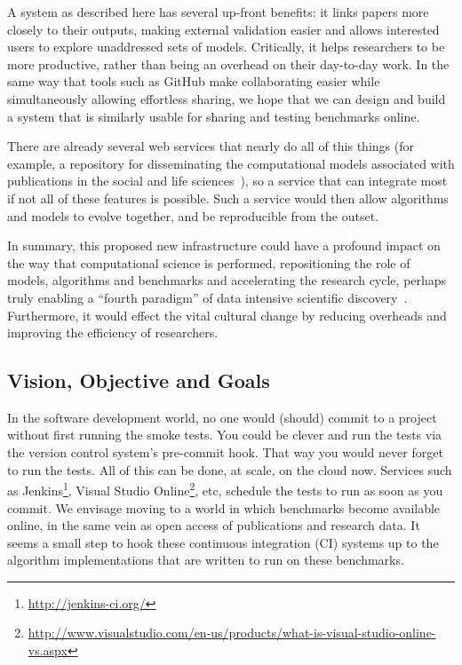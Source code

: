\documentclass[a4paper,11pt]{article}
\begin{document}
A system as described here has several up-front benefits: it links
papers more closely to their outputs, making external validation
easier and allows interested users to explore unaddressed sets of
models. Critically, it helps researchers to be more productive, rather
than being an overhead on their day-to-day work. In the same way that
tools such as GitHub make collaborating easier while simultaneously
allowing effortless sharing, we hope that we can design and build a
system that is similarly usable for sharing and testing benchmarks
online.

There are already several web services that nearly do all of this
things (for example, a repository for disseminating the computational
models associated with publications in the social and life
sciences~\cite{rollins-et-al:2014}), so a service that can integrate
most if not all of these features is possible. Such a service would
then allow algorithms and models to evolve together, and be
reproducible from the outset.

In summary, this proposed new infrastructure could have a profound
impact on the way that computational science is performed,
repositioning the role of models, algorithms and benchmarks and
accelerating the research cycle, perhaps truly enabling a ``fourth
paradigm'' of data intensive scientific
discovery~\cite{hey:2009}. Furthermore, it would effect the vital
cultural change by reducing overheads and improving the efficiency of
researchers.

\subsection*{Vision, Objective and Goals}

In the software development world, no one would (should) commit to a
project without first running the smoke tests. You could be clever and
run the tests via the version control system's pre-commit hook. That
way you would never forget to run the tests. All of this can be done,
at scale, on the cloud now. Services such as
Jenkins\footnote{\url{http://jenkins-ci.org/}}, Visual Studio
Online\footnote{\url{http://www.visualstudio.com/en-us/products/what-is-visual-studio-online-vs.aspx}},
etc, schedule the tests to run as soon as you commit. We envisage
moving to a world in which benchmarks become available online, in the
same vein as open access of publications and research data. It seems a
small step to hook these continuous integration (CI) systems up to the
algorithm implementations that are written to run on these benchmarks.
\end{document}
